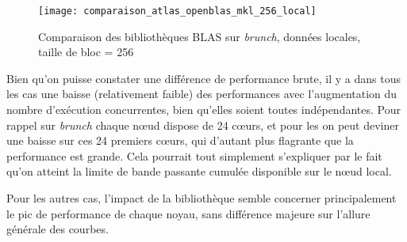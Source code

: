 \begin{figure}[ht]
  \centering
  \texttt{[image: comparaison\_atlas\_openblas\_mkl\_256\_local]}
  \caption{Comparaison des bibliothèques BLAS sur \emph{brunch}, données locales, taille de bloc = 256}\label{fig:contribs:apps:cholesky:perf-blas}
\end{figure}

Bien qu'on puisse constater une différence de performance brute, il y a dans tous les cas une baisse (relativement faible) des performances avec l'augmentation du nombre d'exécution concurrentes, bien qu'elles soient toutes indépendantes.
Pour rappel sur \emph{brunch} chaque nœud dispose de 24 cœurs, et pour les \gemm on peut deviner une baisse sur ces 24 premiers cœurs, qui d'autant plus flagrante que la performance est grande.
Cela pourrait tout simplement s'expliquer par le fait qu'on atteint la limite de bande passante cumulée disponible sur le nœud local.

Pour les autres cas, l'impact de la bibliothèque semble concerner principalement le pic de performance de chaque noyau, sans différence majeure sur l'allure générale des courbes.
